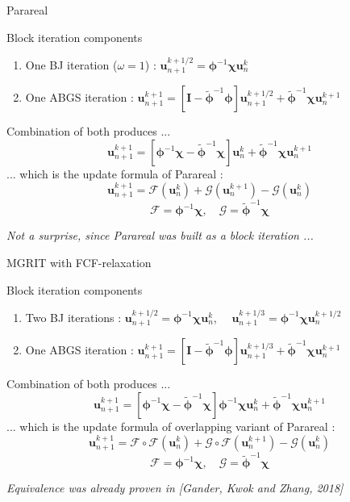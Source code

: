 \documentclass[11pt,aspectratio=43]{beamer}
\newcommand{\matr}[1]{\mathbf{#1}}
\newcommand{\vect}[1]{\boldsymbol{#1}}
\newcommand{\uvect}{\vect{u}}
\newcommand{\phiApprox}{\bm{\tilde{\phi}}}
\begin{document}
\begin{frame}{Parareal}
	\begin{block}{Block iteration components}
		\begin{enumerate}
			\item One BJ iteration ($\omega=1$) : $\uvect_{n+1}^{k+1/2} = \bm{\phi}^{-1}\bm{\chi} \uvect_{n}^k$
			\item One ABGS iteration : $\uvect_{n+1}^{k+1} = [\matr{I} - \bm{\phiApprox}^{-1}\bm{\phi}]\uvect_{n+1}^{k+1/2} + \bm{\phiApprox}^{-1}\bm{\chi} \uvect_{n}^{k+1}$
		\end{enumerate}
	\end{block}\vskip10pt
	Combination of both produces ...
	$$\uvect_{n+1}^{k+1} = [\bm{\phi}^{-1}\bm{\chi} - \bm{\phiApprox}^{-1}\bm{\chi}]\uvect_{n}^k + \bm{\phiApprox}^{-1}\bm{\chi} \uvect_{n}^{k+1}$$
	... which is the update formula of Parareal :
	$$\uvect_{n+1}^{k+1} = \mathcal{F}(\uvect_{n}^k) + \mathcal{G}(\uvect_{n}^{k+1}) - \mathcal{G}(\uvect_{n}^{k})$$
	$$ \mathcal{F} = \bm{\phi}^{-1}\bm{\chi}, \quad \mathcal{G} = \bm{\phiApprox}^{-1}\bm{\chi}$$
	\begin{center}
		\textit{Not a surprise, since Parareal was built as a block iteration ...}
	\end{center}
\end{frame}

\begin{frame}{MGRIT with FCF-relaxation}
	\begin{block}{Block iteration components}
		\begin{enumerate}
			\item Two BJ iterations : $\uvect_{n+1}^{k+1/2} = \bm{\phi}^{-1}\bm{\chi} \uvect_{n}^k$, 
			$\quad\uvect_{n+1}^{k+1/3} = \bm{\phi}^{-1}\bm{\chi} \uvect_{n}^{k+1/2}$
			\item One ABGS iteration : $\uvect_{n+1}^{k+1} = [\matr{I} - \bm{\phiApprox}^{-1}\bm{\phi}]\uvect_{n+1}^{k+1/3} + \bm{\phiApprox}^{-1}\bm{\chi} \uvect_{n}^{k+1}$
		\end{enumerate}
	\end{block}
	\vskip10pt
	Combination of both produces ...
	$$\uvect_{n+1}^{k+1} = [\bm{\phi}^{-1}\bm{\chi} - \bm{\phiApprox}^{-1}\bm{\chi}]\bm{\phi}^{-1}\bm{\chi}\uvect_{n}^k 
	+ \bm{\phiApprox}^{-1}\bm{\chi} \uvect_{n}^{k+1}$$
	... which is the update formula of overlapping variant of Parareal :
	$$\uvect_{n+1}^{k+1} = \mathcal{F}\circ\mathcal{F}(\uvect_{n}^k) + \mathcal{G}\circ\mathcal{F}(\uvect_{n}^{k+1}) - \mathcal{G}(\uvect_{n}^{k})$$
	$$ \mathcal{F} = \bm{\phi}^{-1}\bm{\chi}, \quad \mathcal{G} = \bm{\phiApprox}^{-1}\bm{\chi}$$
	\begin{center}
		\textit{Equivalence was already proven in [Gander, Kwok and Zhang, 2018]}
	\end{center}
\end{frame}
\end{document}

